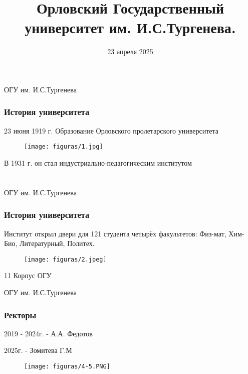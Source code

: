\documentclass{if-beamer}
\title[ОГУ им. И.С.Тургенева.]{\textbf{Орловский Государственный университет им. И.С.Тургенева.}}
\author[Д.А. Селин]{\large \negrito{Д.А. Селин}}
\date{23 апреля 2025}
\begin{document}
\begin{frame}
  \titlepage
\end{frame}


\begin{frame}{ОГУ им. И.С.Тургенева}
  \frametitle{История университета}

  \noindent

  \begin{center}
      23 июня 1919 г. Образование Орловского пролетарского университета
  \end{center}

  \begin{figure}
      \centering
      \texttt{[image: figuras/1.jpg]}
  \end{figure}
  \begin{center}
      В 1931 г. он стал индустриально-педагогическим институтом
  \end{center}
  
\end{frame}

\section{}

\subsection{}
\begin{frame}{ОГУ им. И.С.Тургенева}
    \frametitle{История университета}

    \begin{center}
        Институт открыл двери для 121 студента четырёх факультетов: Физ-мат, Хим-Био, Литературный, Политех.
    \end{center}

    \begin{figure}
        \centering
        \texttt{[image: figuras/2.jpeg]}
    \end{figure}

    \begin{center}
        11 Корпус ОГУ
    \end{center}

\end{frame}


\begin{frame}{ОГУ им. И.С.Тургенева}
\frametitle{Ректоры}

    \begin{center}
        2019 - 2024г. - А.А. Федотов
    \end{center}

    \begin{center}
        2025г. - Зомитева Г.М
    \end{center}

    \begin{figure}
        \centering
        \texttt{[image: figuras/4-5.PNG]}

    \end{figure}

\end{frame}
\end{document}
